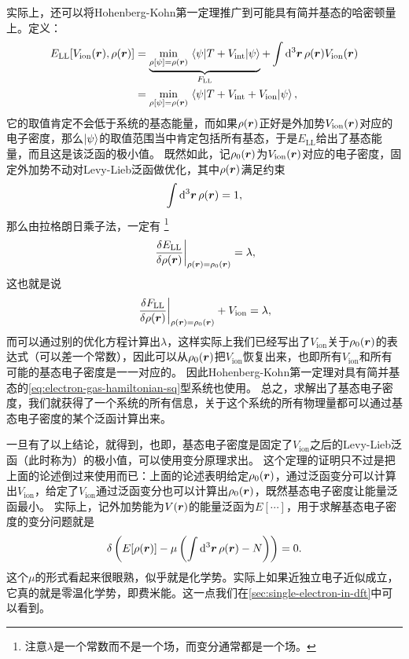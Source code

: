 实际上，还可以将Hohenberg-Kohn第一定理推广到可能具有简并基态的哈密顿量上。定义：
\begin{equation}
    \begin{aligned}
        E_\text{LL} [V_\text{ion}(\vb*{r}), \rho(\vb*{r})]  &= \underbrace{\min_{\rho[\psi]=\rho(\vb*{r})} \mel{\psi}{{T} + {V}_\text{int}}{\psi}}_{F_\text{LL}} + \int \dd[3]{\vb*{r}} \rho(\vb*{r}) V_\text{ion} (\vb*{r}) \\
        &= \min_{\rho[\psi]=\rho(\vb*{r})} \mel{\psi}{{T} + {V_\text{int}} + {V}_\text{ion}}{\psi},
    \end{aligned}
    \label{eq:levy-lieb}
\end{equation}
它的取值肯定不会低于系统的基态能量，而如果$\rho(\vb*{r})$正好是外加势$V_\text{ion}(\vb*{r})$对应的电子密度，那么$\ket{\psi}$的取值范围当中肯定包括所有基态，于是$E_\text{LL}$给出了基态能量，而且这是该泛函的极小值。
既然如此，记$\rho_0(\vb*{r})$为$V_\text{ion}(\vb*{r})$对应的电子密度，固定外加势不动对Levy-Lieb泛函做优化，其中$\rho(\vb*{r})$满足约束
\[
    \int \dd[3]{\vb*{r}} \rho(\vb*{r}) = 1,
\]
那么由拉格朗日乘子法，一定有%
\footnote{注意$\lambda$是一个常数而不是一个场，而变分通常都是一个场。}%
\[
    \eval{\fdv{E_\text{LL}}{\rho(\vb*{r})}}_{\rho(\vb*{r}) = \rho_0 (\vb*{r})} = \lambda,
\]
这也就是说
\[
    \eval{\fdv{F_\text{LL}}{\rho(\vb*{r})}}_{\rho(\vb*{r}) = \rho_0(\vb*{r})} + V_\text{ion} = \lambda,
\]
而可以通过别的优化方程计算出$\lambda$，这样实际上我们已经写出了$V_\text{ion}$关于$\rho_0(\vb*{r})$的表达式（可以差一个常数），因此可以从$\rho_0(\vb*{r})$把$V_\text{ion}$恢复出来，也即所有$V_\text{ion}$和所有可能的基态电子密度是一一对应的。
因此Hohenberg-Kohn第一定理对具有简并基态的\eqref{eq:electron-gas-hamiltonian-sq}型系统也使用。
总之，求解出了基态电子密度，我们就获得了一个系统的所有信息，关于这个系统的所有物理量都可以通过基态电子密度的某个泛函计算出来。

一旦有了以上结论，就得到，也即，基态电子密度是固定了$V_\text{ion}$之后的Levy-Lieb泛函（此时称为）的极小值，可以使用变分原理求出。
这个定理的证明只不过是把上面的论述倒过来使用而已：上面的论述表明给定$\rho_0(\vb*{r})$，通过泛函变分可以计算出$V_\text{ion}$，给定了$V_\text{ion}$通过泛函变分也可以计算出$\rho_0(\vb*{r})$，既然基态电子密度让能量泛函最小。
实际上，记外加势能为$V(\vb*{r})$的能量泛函为$E[\cdots]$，用于求解基态电子密度的变分问题就是
\begin{equation}
    \var \left( E[\rho(\vb*{r})] - \mu \left( \int \dd[3]{\vb*{r}} \rho(\vb*{r}) - N \right) \right) = 0.
    \label{eq:dft-variation-principle}
\end{equation}
这个$\mu$的形式看起来很眼熟，似乎就是化学势。实际上如果近独立电子近似成立，它真的就是零温化学势，即费米能。这一点我们在\autoref{sec:single-electron-in-dft}中可以看到。

